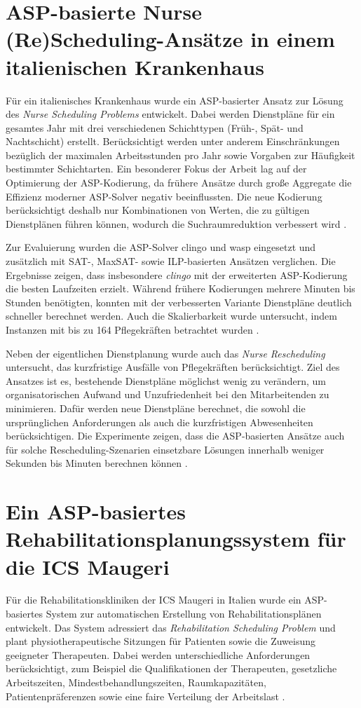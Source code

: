 \section{ASP-basierte Nurse (Re)Scheduling-Ansätze in einem italienischen Krankenhaus}
Für ein italienisches Krankenhaus wurde ein ASP-basierter Ansatz zur Lösung des \textit{Nurse Scheduling Problems} entwickelt. Dabei werden Dienstpläne für ein gesamtes Jahr mit drei verschiedenen Schichttypen (Früh-, Spät- und Nachtschicht) erstellt. Berücksichtigt werden unter anderem Einschränkungen bezüglich der maximalen Arbeitsstunden pro Jahr sowie Vorgaben zur Häufigkeit bestimmter Schichtarten. Ein besonderer Fokus der Arbeit lag auf der Optimierung der ASP-Kodierung, da frühere Ansätze durch große Aggregate die Effizienz moderner ASP-Solver negativ beeinflussten. Die neue Kodierung berücksichtigt deshalb nur Kombinationen von Werten, die zu gültigen Dienstplänen führen können, wodurch die Suchraumreduktion verbessert wird \parencite{alvianoNurseReschedulingAnswer2019}.

Zur Evaluierung wurden die ASP-Solver clingo und wasp eingesetzt und zusätzlich mit SAT-, MaxSAT- sowie ILP-basierten Ansätzen verglichen. Die Ergebnisse zeigen, dass insbesondere \textit{clingo} mit der erweiterten ASP-Kodierung die besten Laufzeiten erzielt. Während frühere Kodierungen mehrere Minuten bis Stunden benötigten, konnten mit der verbesserten Variante Dienstpläne deutlich schneller berechnet werden. Auch die Skalierbarkeit wurde untersucht, indem Instanzen mit bis zu 164 Pflegekräften betrachtet wurden \parencite{alvianoNurseReschedulingAnswer2019}.

Neben der eigentlichen Dienstplanung wurde auch das \textit{Nurse Rescheduling} untersucht, das kurzfristige Ausfälle von Pflegekräften berücksichtigt. Ziel des Ansatzes ist es, bestehende Dienstpläne möglichst wenig zu verändern, um organisatorischen Aufwand und Unzufriedenheit bei den Mitarbeitenden zu minimieren. Dafür werden neue Dienstpläne berechnet, die sowohl die ursprünglichen Anforderungen als auch die kurzfristigen Abwesenheiten berücksichtigen. Die Experimente zeigen, dass die ASP-basierten Ansätze auch für solche Rescheduling-Szenarien einsetzbare Lösungen innerhalb weniger Sekunden bis Minuten berechnen können \parencite{alvianoNurseReschedulingAnswer2019}.

\section{Ein ASP-basiertes Rehabilitationsplanungssystem für die ICS Maugeri}
Für die Rehabilitationskliniken der ICS Maugeri in Italien wurde ein ASP-basiertes System zur automatischen Erstellung von Rehabilitationsplänen entwickelt. Das System adressiert das \textit{Rehabilitation Scheduling Problem} und plant physiotherapeutische Sitzungen für Patienten sowie die Zuweisung geeigneter Therapeuten. Dabei werden unterschiedliche Anforderungen berücksichtigt, zum Beispiel die Qualifikationen der Therapeuten, gesetzliche Arbeitszeiten, Mindestbehandlungszeiten, Raumkapazitäten, Patientenpräferenzen sowie eine faire Verteilung der Arbeitslast \parencite{cardellini2023solvingrehabilitationschedulingproblems}.

